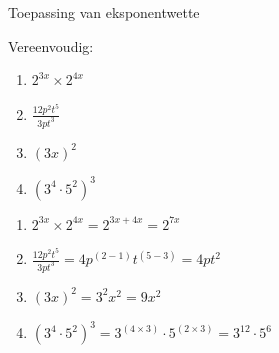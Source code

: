       

\begin{wex}
{ %
Toepassing van eksponentwette
}
{%
Vereenvoudig:

\begin{enumerate}[noitemsep, label=\textbf{\arabic*}.]
\item  $2^{3x} \times 2^{4x}$
\\
 \item $\frac{12p^2t^5}{3pt^3}$
\\
 \item $ (3x)^2 $
\\
 \item $(3^4\cdot5^2)^3$\\
\end{enumerate}

}
{%

\begin{enumerate}[noitemsep, label=\textbf{\arabic*}.]
\item  $2^{3x} \times 2^{4x} = 2^{3x+4x} = 2^{7x}$
\\
 \item $\frac{12p^2t^5}{3pt^3} = 4p^{(2-1)}t^{(5-3)} = 4pt^2$
\\
 \item $ (3x)^2 = 3^2x^2 = 9x^2$
\\
 \item $(3^4\cdot5^2)^3 = 3^{(4\times3)}\cdot5^{(2\times3)} = 3^{12}\cdot5^6  $
\end{enumerate}



}


\end{wex}










